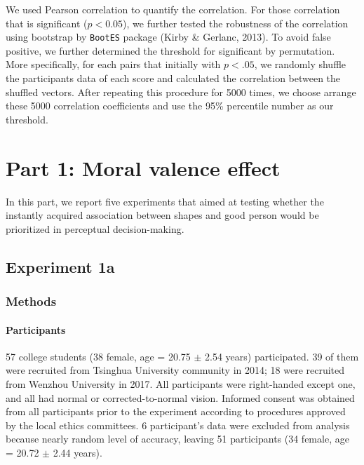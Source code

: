 \documentclass[
  english,
  man]{apa6}
\let\oldparagraph\paragraph
\renewcommand{\paragraph}[1]{\oldparagraph{#1}\mbox{}}
\begin{document}
We used Pearson correlation to quantify the correlation. For those correlation that is significant (\(p < 0.05\)), we further tested the robustness of the correlation using bootstrap by \texttt{BootES} package (Kirby \& Gerlanc, 2013). To avoid false positive, we further determined the threshold for significant by permutation. More specifically, for each pairs that initially with \(p < .05\), we randomly shuffle the participants data of each score and calculated the correlation between the shuffled vectors. After repeating this procedure for 5000 times, we choose arrange these 5000 correlation coefficients and use the 95\% percentile number as our threshold.

\hypertarget{part-1-moral-valence-effect}{%
\section{Part 1: Moral valence effect}\label{part-1-moral-valence-effect}}

In this part, we report five experiments that aimed at testing whether the instantly acquired association between shapes and good person would be prioritized in perceptual decision-making.

\hypertarget{experiment-1a}{%
\subsection{Experiment 1a}\label{experiment-1a}}

\hypertarget{methods}{%
\subsubsection{Methods}\label{methods}}

\hypertarget{participants}{%
\paragraph{Participants}\label{participants}}

57 college students (38 female, age = 20.75 \(\pm\) 2.54 years) participated. 39 of them were recruited from Tsinghua University community in 2014; 18 were recruited from Wenzhou University in 2017. All participants were right-handed except one, and all had normal or corrected-to-normal vision. Informed consent was obtained from all participants prior to the experiment according to procedures approved by the local ethics committees. 6 participant's data were excluded from analysis because nearly random level of accuracy, leaving 51 participants (34 female, age = 20.72 \(\pm\) 2.44 years).
\end{document}
